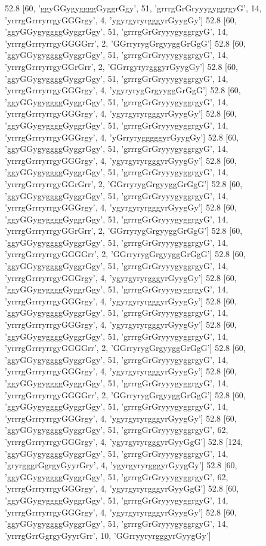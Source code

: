 52.8 [60, 'ggyGGygyggggGyggrGgy', 51, 'grrrgGrGryyygyggrgyG', 14, 'yrrrgGrrryrrgyGGGrgy', 4, 'ygyrgyryrgggyrGyygGy']
52.8 [60, 'ggyGGygyggggGyggrGgy', 51, 'grrrgGrGryyygyggrgyG', 14, 'yrrrgGrrryrrgyGGGGrr', 2, 'GGrryrygGrgyyggGrGgG']
52.8 [60, 'ggyGGygyggggGyggrGgy', 51, 'grrrgGrGryyygyggrgyG', 14, 'yrrrgGrrryrrgyGGrGrr', 2, 'GGrrgyryrgggyrGyygGy']
52.8 [60, 'ggyGGygyggggGyggrGgy', 51, 'grrrgGrGryyygyggrgyG', 14, 'yrrrgGrrryrrgyGGGrgy', 4, 'ygyryrygGrgyyggGrGgG']
52.8 [60, 'ggyGGygyggggGyggrGgy', 51, 'grrrgGrGryyygyggrgyG', 14, 'yrrrgGrrryrrgyGGGrgy', 4, 'ygyrgyryrgggyrGyygGy']
52.8 [60, 'ggyGGygyggggGyggrGgy', 51, 'grrrgGrGryyygyggrgyG', 14, 'yrrrgGrrryrrgyGGGrgy', 4, 'yGrryrygggggyrGyygGy']
52.8 [60, 'ggyGGygyggggGyggrGgy', 51, 'grrrgGrGryyygyggrgyG', 14, 'yrrrgGrrryrrgyGGGrgy', 4, 'ygyrgyryrgggyrGyygGy']
52.8 [60, 'ggyGGygyggggGyggrGgy', 51, 'grrrgGrGryyygyggrgyG', 14, 'yrrrgGrrryrrgyGGrGrr', 2, 'GGrryrygGrgyyggGrGgG']
52.8 [60, 'ggyGGygyggggGyggrGgy', 51, 'grrrgGrGryyygyggrgyG', 14, 'yrrrgGrrryrrgyGGGrgy', 4, 'ygyrgyryrgggyrGyygGy']
52.8 [60, 'ggyGGygyggggGyggrGgy', 51, 'grrrgGrGryyygyggrgyG', 14, 'yrrrgGrrryrrgyGGrGrr', 2, 'GGrryrygGrgyyggGrGgG']
52.8 [60, 'ggyGGygyggggGyggrGgy', 51, 'grrrgGrGryyygyggrgyG', 14, 'yrrrgGrrryrrgyGGGGrr', 2, 'GGrryrygGrgyyggGrGgG']
52.8 [60, 'ggyGGygyggggGyggrGgy', 51, 'grrrgGrGryyygyggrgyG', 14, 'yrrrgGrrryrrgyGGGrgy', 4, 'ygyrgyryrgggyrGyygGy']
52.8 [60, 'ggyGGygyggggGyggrGgy', 51, 'grrrgGrGryyygyggrgyG', 14, 'yrrrgGrrryrrgyGGGrgy', 4, 'ygyrgyryrgggyrGyygGy']
52.8 [60, 'ggyGGygyggggGyggrGgy', 51, 'grrrgGrGryyygyggrgyG', 14, 'yrrrgGrrryrrgyGGGrgy', 4, 'ygyrgyryrgggyrGyygGy']
52.8 [60, 'ggyGGygyggggGyggrGgy', 51, 'grrrgGrGryyygyggrgyG', 14, 'yrrrgGrrryrrgyGGGGrr', 2, 'GGrryrygGrgyyggGrGgG']
52.8 [60, 'ggyGGygyggggGyggrGgy', 51, 'grrrgGrGryyygyggrgyG', 14, 'yrrrgGrrryrrgyGGGrgy', 4, 'ygyrgyryrgggyrGyygGy']
52.8 [60, 'ggyGGygyggggGyggrGgy', 51, 'grrrgGrGryyygyggrgyG', 14, 'yrrrgGrrryrrgyGGGGrr', 2, 'GGrryrygGrgyyggGrGgG']
52.8 [60, 'ggyGGygyggggGyggrGgy', 51, 'grrrgGrGryyygyggrgyG', 14, 'yrrrgGrrryrrgyGGGrgy', 4, 'ygyrgyryrgggyrGyygGy']
52.8 [60, 'ggyGGygyggggGyggrGgy', 51, 'grrrgGrGryyygyggrgyG', 62, 'yrrrgGrrryrrgyGGGrgy', 4, 'ygyrgyryrgggyrGyyGgG']
52.8 [124, 'ggyGGygyggggGyggrGgy', 51, 'grrrgGrGryyygyggrgyG', 14, 'gryrgggrGgrgyGyyrGry', 4, 'ygyrgyryrgggyrGyygGy']
52.8 [60, 'ggyGGygyggggGyggrGgy', 51, 'grrrgGrGryyygyggrgyG', 62, 'yrrrgGrrryrrgyGGGrgy', 4, 'ygyrgyryrgggyrGyyGgG']
52.8 [60, 'ggyGGygyggggGyggrGgy', 51, 'grrrgGrGryyygyggrgyG', 14, 'yrrrgGrrryrrgyGGGrgy', 4, 'ygyrgyryrgggyrGyygGy']
52.8 [60, 'ggyGGygyggggGyggrGgy', 51, 'grrrgGrGryyygyggrgyG', 14, 'yrrrgGrrGgrgyGyyrGrr', 10, 'GGrryyryrgggyrGyygGy']
